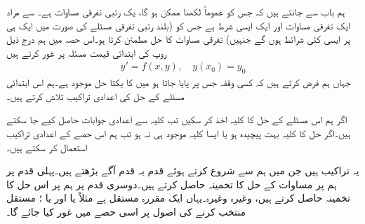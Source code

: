 
ہم باب  سے جانتے ہیں کہ  جس کو عموماً  لکھنا ممکن ہو گا، یک رتبی تفرقی مساوات ہے۔ سے مراد ایک تفرقی مساوات اور ایک ایسی شرط ہے  جس کو (بلند رتبی تفرقی مسئلے کی صورت میں ایک ہی  پر ایسی کئی شرائط ہوں گے جنہیں) تفرقی مساوات کا حل مطمئن کرتا ہو۔اس حصہ میں ہم درج ذیل روپ کی ابتدائی قیمت مسئلہ پر غور کرتے ہیں
\begin{align}\label{مساوات_اعدادی_ابتدائی_مسئلہ_الف}
y'=f(x,y),\quad y(x_0)=y_0
\end{align}
جہاں ہم فرض کرتے ہیں کہ کسی وقفہ جس پر  پایا جاتا ہو میں  کا یکتا حل موجود ہے۔ہم اس ابتدائی مسئلے کے حل کی اعدادی تراکیب تلاش کرتے ہیں۔

اگر ہم اس مسئلے کے حل کا کلیہ اخذ کر سکیں تب کلیہ سے اعدادی جوابات حاصل کیے جا سکتے ہیں۔اگر حل کا کلیہ بہت پیچیدہ ہو یا ایسا کلیہ موجود ہی نہ ہو تب ہم اس حصے کے  اعدادی تراکیب استعمال کر سکتے ہیں۔

یہ تراکیب  ہیں جن میں ہم   سے شروع کرتے ہوئے قدم بہ قدم آگے بڑھتے ہیں۔پہلی قدم پر ہم   پر مساوات  کے حل  کا تخمینہ  حاصل کرتے ہیں۔دوسری قدم پر ہم   پر اس حل کا تخمینہ  حاصل کرتے ہیں، وغیرہ وغیرہ۔یہاں  ایک مقررہ مستقل ہے مثلاً  یا  اور یا ؛ مستقل  منتخب کرنے کی اصول پر اسی حصے میں غور کیا جائے گا۔

